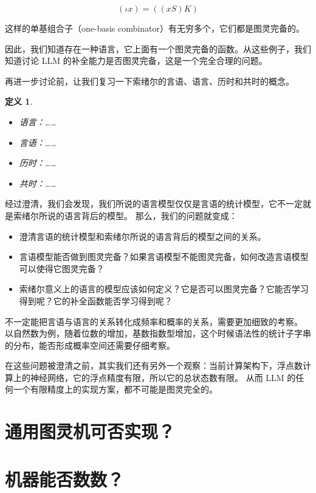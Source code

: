 \documentclass[a4paper,12pt]{article}
\numberwithin{problem}{section}
\newtheorem{definition}{定义}
\numberwithin{definition}{section}
\numberwithin{lemma}{section}
\numberwithin{proposition}{section}
\numberwithin{theorem}{section}
\numberwithin{grammar}{section}
\numberwithin{program}{section}
\numberwithin{convention}{section}
\numberwithin{corollary}{section}
\begin{document}
$$
(\iota x) = ((x S) K)
$$

这样的单基组合子（one-basis combinator）有无穷多个，它们都是图灵完备的。

因此，我们知道存在一种语言，它上面有一个图灵完备的函数。从这些例子，我们知道讨论 LLM 的补全能力是否图灵完备，这是一个完全合理的问题。

再进一步讨论前，让我们复习一下索绪尔的言语、语言、历时和共时的概念。

\begin{definition}
\begin{itemize}
    \item 语言：……
    \item 言语：……
    \item 历时：……
    \item 共时：……
\end{itemize}
\end{definition}

经过澄清，我们会发现，我们所说的语言模型仅仅是言语的统计模型，它不一定就是索绪尔所说的语言背后的模型。
那么，我们的问题就变成：
\begin{itemize}
    \item 澄清言语的统计模型和索绪尔所说的语言背后的模型之间的关系。
    \item 言语模型能否做到图灵完备？如果言语模型不能图灵完备，如何改造言语模型可以使得它图灵完备？
    \item 索绪尔意义上的语言的模型应该如何定义？它是否可以图灵完备？它能否学习得到呢？它的补全函数能否学习得到呢？
\end{itemize}

不一定能把言语与语言的关系转化成频率和概率的关系，需要更加细致的考察。
以自然数为例，随着位数的增加，基数指数型增加，这个时候语法性的统计子字串的分布，能否形成概率空间还需要仔细考察。

在这些问题被澄清之前，其实我们还有另外一个观察：当前计算架构下，浮点数计算上的神经网络，它的浮点精度有限，所以它的总状态数有限。
从而 LLM 的任何一个有限精度上的实现方案，都不可能是图灵完全的。

\section{通用图灵机可否实现？}



\section{机器能否数数？}
\end{document}
